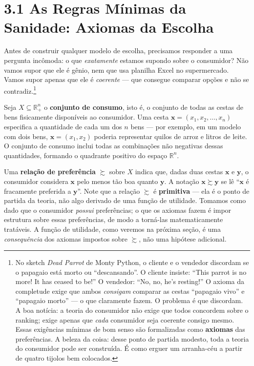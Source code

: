 \documentclass[11pt,twoside,openright]{book}
\begin{document}
\section{3.1 As Regras Mínimas da Sanidade: Axiomas da
Escolha}\label{as-regras-muxednimas-da-sanidade-axiomas-da-escolha}

Antes de construir qualquer modelo de escolha, precisamos responder a
uma pergunta incômoda: o que \emph{exatamente} estamos supondo sobre o
consumidor? Não vamos supor que ele é gênio, nem que usa planilha Excel
no supermercado. Vamos supor apenas que ele é \emph{coerente} --- que
consegue comparar opções e não se contradiz.\footnote{No sketch
  \emph{Dead Parrot} de Monty Python, o cliente e o vendedor discordam
  se o papagaio está morto ou ``descansando''. O cliente insiste: ``This
  parrot is no more! It has ceased to be!'' O vendedor: ``No, no, he's
  resting!'' O axioma da completude exige que ambos \emph{consigam}
  comparar as cestas ``papagaio vivo'' e ``papagaio morto'' --- o que
  claramente fazem. O problema é que discordam. A boa notícia: a teoria
  do consumidor não exige que todos concordem sobre o ranking; exige
  apenas que \emph{cada} consumidor seja coerente consigo mesmo. Essas
  exigências mínimas de bom senso são formalizadas como \textbf{axiomas}
  das preferências. A beleza da coisa: desse ponto de partida modesto,
  toda a teoria do consumidor pode ser construída. É como erguer um
  arranha-céu a partir de quatro tijolos bem colocados.}

Seja \(X \subseteq \mathbb{R}^n_+\) o \textbf{conjunto de consumo}, isto
é, o conjunto de todas as cestas de bens fisicamente disponíveis ao
consumidor. Uma cesta \(\mathbf{x} = (x_1, x_2, \ldots, x_n)\)
especifica a quantidade de cada um dos \(n\) bens --- por exemplo, em um
modelo com dois bens, \(\mathbf{x} = (x_1, x_2)\) poderia representar
quilos de arroz e litros de leite. O conjunto de consumo inclui todas as
combinações não negativas dessas quantidades, formando o quadrante
positivo do espaço \(\mathbb{R}^n\).

Uma \textbf{relação de preferência} \(\succsim\) sobre \(X\) indica que,
dadas duas cestas \(\mathbf{x}\) e \(\mathbf{y}\), o consumidor
considera \(\mathbf{x}\) pelo menos tão boa quanto \(\mathbf{y}\). A
notação \(\mathbf{x} \succsim \mathbf{y}\) se lê ``\(\mathbf{x}\) é
fracamente preferida a \(\mathbf{y}\)''. Note que a relação \(\succsim\)
é \textbf{primitiva} --- ela é o ponto de partida da teoria, não algo
derivado de uma função de utilidade. Tomamos como dado que o consumidor
\emph{possui} preferências; o que os axiomas fazem é impor estrutura
sobre essas preferências, de modo a torná-las matematicamente tratáveis.
A função de utilidade, como veremos na próxima seção, é uma
\emph{consequência} dos axiomas impostos sobre \(\succsim\), não uma
hipótese adicional.
\end{document}

